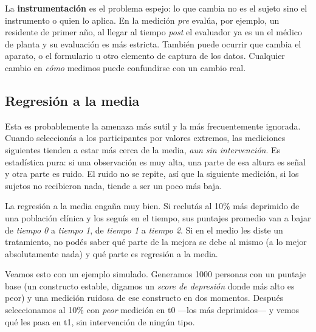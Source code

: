 \documentclass[
  letterpaper,
  DIV=11,
  numbers=noendperiod,
  oneside]{scrreprt}
\begin{document}
La \textbf{instrumentación} es el problema espejo: lo que cambia no es
el sujeto sino el instrumento o quien lo aplica. En la medición
\emph{pre} evalúa, por ejemplo, un residente de primer año, al llegar al
tiempo \emph{post} el evaluador ya es un el médico de planta y su
evaluación es más estricta. También puede ocurrir que cambia el aparato,
o el formulario u otro elemento de captura de los datos. Cualquier
cambio en \emph{cómo} medimos puede confundirse con un cambio real.

\hypertarget{regresiuxf3n-a-la-media}{%
\subsection{Regresión a la media}\label{regresiuxf3n-a-la-media}}

Esta es probablemente la amenaza más sutil y la más frecuentemente
ignorada. Cuando seleccionás a los participantes por valores extremos,
las mediciones siguientes tienden a estar más cerca de la media,
\emph{aun sin intervención}. Es estadística pura: si una observación es
muy alta, una parte de esa altura es señal y otra parte es ruido. El
ruido no se repite, así que la siguiente medición, si los sujetos no
recibieron nada, tiende a ser un poco más baja.

La regresión a la media engaña muy bien. Si reclutás al 10\% más
deprimido de una población clínica y los seguís en el tiempo, sus
puntajes promedio van a bajar de \emph{tiempo 0} a \emph{tiempo 1}, de
\emph{tiempo 1} a \emph{tiempo 2}. Si en el medio les diste un
tratamiento, no podés saber qué parte de la mejora se debe al mismo (a
lo mejor absolutamente nada) y qué parte es regresión a la media.

Veamos esto con un ejemplo simulado. Generamos 1000 personas con un
puntaje base (un constructo estable, digamos un \emph{score de
depresión} donde más alto es peor) y una medición ruidosa de ese
constructo en dos momentos. Después seleccionamos al 10\% con
\emph{peor} medición en t0 ---los más deprimidos--- y vemos qué les pasa
en t1, sin intervención de ningún tipo.
\end{document}
